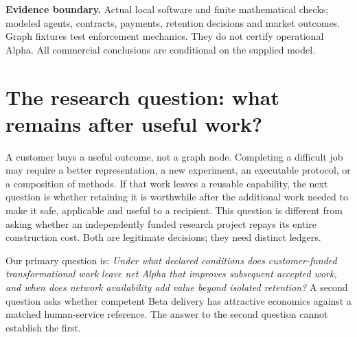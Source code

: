 \documentclass[11pt,letterpaper]{article}
\begin{document}
\begin{titlepage}
\begin{abstract}
scenario and arm. Central Beta produces USD3.70 million modeled surplus over
the horizon, but no primary scenario establishes a positive network increment.
Favorable retention yields a paired mean of USD$-8,766$, with a conditional
95\% Monte Carlo interval spanning loss and gain. No separate research policy
is selected. Official token prices and human
service schedules anchor costs, while workloads, acceptance, transfer and buyer
behavior remain explicit assumptions. No customer sale, live frontier task trial,
ENS enforcement, production admission or financial settlement is demonstrated.
The contribution is a reproducible mechanism, a complete accounting boundary,
and falsifiable conditions for useful accumulation rather than an assumed
self-accelerating economy.
\end{abstract}
\vfill
\colorbox{light}{\parbox{0.95\linewidth}{\small
\textbf{Evidence boundary.} Actual local software and finite mathematical checks;
modeled agents, contracts, payments, retention decisions and market outcomes.
Graph fixtures test enforcement mechanics. They do not certify operational Alpha.
All commercial conclusions are conditional on the supplied model.}}
\end{titlepage}
\hypersetup{pageanchor=true}

\section{The research question: what remains after useful work?}

A customer buys a useful outcome, not a graph node. Completing a difficult job may
require a better representation, a new experiment, an executable protocol, or a
composition of methods. If that work leaves a reusable capability, the next
question is whether retaining it is worthwhile after the additional work needed
to make it safe, applicable and useful to a recipient. This question is different
from asking whether an independently funded research project repays its entire
construction cost. Both are legitimate decisions; they need distinct ledgers.

Our primary question is: \emph{Under what declared conditions does customer-funded
transformational work leave net Alpha that improves subsequent accepted work,
and when does network availability add value beyond isolated retention?} A
second question asks whether competent Beta delivery has attractive economics
against a matched human-service reference. The answer to the second question
cannot establish the first.
\end{document}
